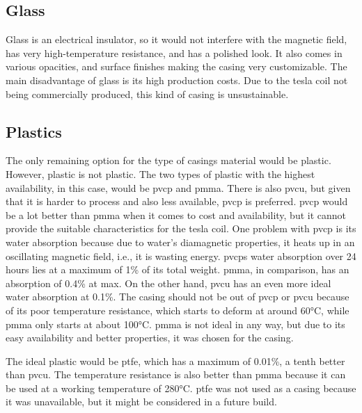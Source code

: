 \subsection{Glass}

Glass is an electrical insulator, so it would not interfere with the magnetic field, has very high-temperature resistance, and has a polished look. It also comes in various opacities, and surface finishes making the casing very customizable. The main disadvantage of glass is its high production costs. Due to the tesla coil not being commercially produced, this kind of casing is unsustainable.

\subsection{Plastics}

The only remaining option for the type of casings material would be plastic. However, plastic is not plastic. The two types of plastic with the highest availability, in this case, would be \gls{pvcp} and \gls{pmma}. There is also \gls{pvcu}, but given that it is harder to process and also less available, \gls{pvcp} is preferred. \gls{pvcp} would be a lot better than \gls{pmma} when it comes to cost and availability, but it cannot provide the suitable characteristics for the tesla coil. One problem with \gls{pvcp} is its water absorption because due to water's diamagnetic properties, it heats up in an oscillating magnetic field, i.e., it is wasting energy. \gls{pvcp}s water absorption over 24 hours lies at a maximum of 1\% of its total weight. \gls{pmma}, in comparison, has an absorption of 0.4\% at max. On the other hand, \gls{pvcu} has an even more ideal water absorption at 0.1\%. The casing should not be out of \gls{pvcp} or \gls{pvcu} because of its poor temperature resistance, which starts to deform at around 60°C, while \gls{pmma} only starts at about 100°C. \gls{pmma} is not ideal in any way, but due to its easy availability and better properties, it was chosen for the casing. 

The ideal plastic would be \gls{ptfe}, which has a maximum of 0.01\%, a tenth better than \gls{pvcu}. The temperature resistance is also better than \gls{pmma} because it can be used at a working temperature of 280°C. \gls{ptfe} was not used as a casing because it was unavailable, but it might be considered in a future build.  

